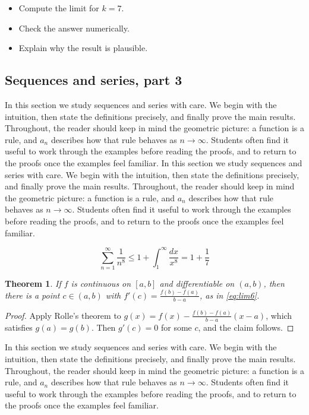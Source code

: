 \documentclass[11pt]{article}
\newtheorem{theorem}{Theorem}[section]
\begin{document}
\begin{itemize}
  \item Compute the limit for $k = 7$.
  \item Check the answer numerically.
  \item Explain why the result is plausible.
\end{itemize}

\subsection{Sequences and series, part 3}

In this section we study sequences and series with care. We begin with the intuition, then state the definitions precisely, and finally prove the main results. Throughout, the reader should keep in mind the geometric picture: a function is a rule, and $a_n$ describes how that rule behaves as $n \to \infty$. Students often find it useful to work through the examples before reading the proofs, and to return to the proofs once the examples feel familiar. In this section we study sequences and series with care. We begin with the intuition, then state the definitions precisely, and finally prove the main results. Throughout, the reader should keep in mind the geometric picture: a function is a rule, and $a_n$ describes how that rule behaves as $n \to \infty$. Students often find it useful to work through the examples before reading the proofs, and to return to the proofs once the examples feel familiar. 

\[
  \sum_{n=1}^{\infty} \frac{1}{n^{8}} \le 1 + \int_1^{\infty} \frac{dx}{x^{8}} = 1 + \frac{1}{7}
\]

\begin{theorem}
If $f$ is continuous on $[a,b]$ and differentiable on $(a,b)$, then there is a point $c \in (a,b)$ with $f'(c) = \frac{f(b)-f(a)}{b-a}$, as in \eqref{eq:lim6}.
\end{theorem}

\begin{proof}
Apply Rolle's theorem to $g(x) = f(x) - \frac{f(b)-f(a)}{b-a}(x-a)$, which satisfies $g(a) = g(b)$. Then $g'(c) = 0$ for some $c$, and the claim follows.
\end{proof}

In this section we study sequences and series with care. We begin with the intuition, then state the definitions precisely, and finally prove the main results. Throughout, the reader should keep in mind the geometric picture: a function is a rule, and $a_n$ describes how that rule behaves as $n \to \infty$. Students often find it useful to work through the examples before reading the proofs, and to return to the proofs once the examples feel familiar. 
\end{document}
